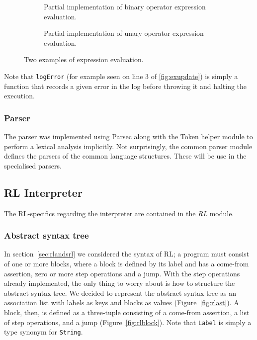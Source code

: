 \begin{figure}[h]

  \begin{subfigure}{\textwidth}
    
    \caption{Partial implementation of binary operator expression evaluation.}\label{fig:exbinary}
  \end{subfigure}

  \begin{subfigure}{\textwidth}
    
    \caption{Partial implementation of unary operator expression evaluation.}\label{fig:exunary}
  \end{subfigure}

  \caption{Two examples of expression evaluation.}\label{fig:evalexamples}

\end{figure}

Note that \texttt{logError} (for example seen on line 3 of \ref{fig:exupdate}) is simply a function that records a given error in the log before throwing it and halting the execution.

\subsubsection{Parser}
The parser was implemented using Parsec along with the Token helper module to perform a lexical analysis implicitly. Not surprisingly, the common parser module defines the parsers of the common language structures. These will be use in the specialised parsers.





\subsection{RL Interpreter}

The RL-specifics regarding the interpreter are contained in the \textit{RL} module.

\subsubsection{Abstract syntax tree}

In section~\ref{sec:rlandsrl} we considered the syntax of RL; a program must consist of one or more blocks, where a block is defined by its label and has a come-from assertion, zero or more step operations and a jump. With the step operations already implemented, the only thing to worry about is how to structure the abstract syntax tree. We decided to represent the abstract syntax tree as an association list with labels as keys and blocks as values (Figure~\ref{fig:rlast}). A block, then, is defined as a three-tuple consisting of a come-from assertion, a list of step operations, and a jump (Figure~\ref{fig:rlblock}). Note that \texttt{Label} is simply a type synonym for \texttt{String}.

